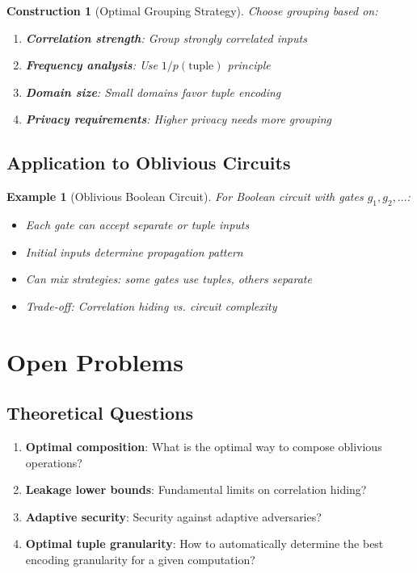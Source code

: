 \documentclass[11pt,final,hidelinks]{article}
\newtheorem{example}[theorem]{Example}
\newtheorem{construction}[theorem]{Construction}
\begin{document}
\begin{construction}[Optimal Grouping Strategy]
Choose grouping based on:
\begin{enumerate}
    \item \textbf{Correlation strength}: Group strongly correlated inputs
    \item \textbf{Frequency analysis}: Use $1/p(\text{tuple})$ principle
    \item \textbf{Domain size}: Small domains favor tuple encoding
    \item \textbf{Privacy requirements}: Higher privacy needs more grouping
\end{enumerate}
\end{construction}

\subsection{Application to Oblivious Circuits}

\begin{example}[Oblivious Boolean Circuit]
For Boolean circuit with gates $g_1, g_2, \ldots$:
\begin{itemize}
    \item Each gate can accept separate or tuple inputs
    \item Initial inputs determine propagation pattern
    \item Can mix strategies: some gates use tuples, others separate
    \item Trade-off: Correlation hiding vs. circuit complexity
\end{itemize}
\end{example}

\section{Open Problems}

\subsection{Theoretical Questions}

\begin{enumerate}
    \item \textbf{Optimal composition}: What is the optimal way to compose oblivious operations?
    \item \textbf{Leakage lower bounds}: Fundamental limits on correlation hiding?
    \item \textbf{Adaptive security}: Security against adaptive adversaries?
    \item \textbf{Optimal tuple granularity}: How to automatically determine the best encoding granularity for a given computation?
\end{enumerate}
\end{document}

